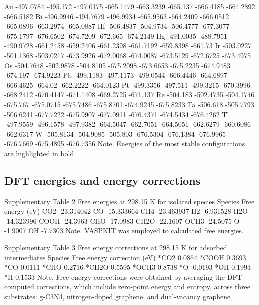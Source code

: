 Au	-497.0784	-495.172	-497.0175	-665.1479	-663.3239	-665.137	-666.4185	-664.2892	-666.5182
Bi	-496.9946	-494.7679	-496.9934	-665.9563	-664.2409	-666.0512	-665.0896	-663.2974	-665.0887
Hf	-506.4837	-504.9734	-506.4777	-677.3077	-675.1797	-676.6502	-674.7209	-672.665	-674.2149
Hg	-491.0035	-488.7951	-490.9728	-661.2458	-659.2406	-661.2398	-661.7192	-659.8398	-661.73
Ir	-503.0227	-501.1368	-503.0217	-673.9926	-672.0068	-674.0087	-673.5129	-672.6725	-673.4975
Os	-504.7648	-502.9878	-504.8105	-675.2098	-673.6653	-675.2235	-674.9483	-674.197	-674.9223
Pb	-499.1183	-497.1173	-499.0544	-666.4446	-664.6897	-666.4625	-664.02	-662.2222	-664.0123
Pt	-499.3356	-497.511	-499.3215	-670.3996	-668.2412	-670.4147	-671.1408	-669.2725	-671.137
Re	-504.183	-502.4735	-504.1746	-675.767	-675.0715	-675.7486	-675.8701	-674.9245	-675.8233
Ta	-506.618	-505.7793	-506.6241	-677.7222	-675.9907	-677.0911	-676.4371	-674.5434	-676.4262
Tl	-497.9559	-496.1578	-497.9382	-664.5047	-662.7051	-664.5051	-662.6279	-660.6086	-662.6317
W	-505.8134	-504.9085	-505.803	-676.5304	-676.1384	-676.9965	-676.7669	-675.4895	-676.7356
Note. Energies of the most stable configurations are highlighted in bold.


\subsection{DFT energies and energy corrections}


Supplementary Table 2
Free energies at 298.15 K for isolated species
Species	Free energy (eV)
CO2	-23.314042
CO	-15.333664
CH4	-23.463937
H2	-6.931528
H2O	-14.323996
COOH	-24.3963
CHO	-17.0983
CH2O	-22.1607
OCH3	-24.5075
O	-1.9007
OH	-7.7303
Note. VASPKIT \cite{wang2021vaspkit} was employed to calculated free energies.


Supplementary Table 3
Free energy corrections at 298.15 K for adsorbed intermediates
Species	Free energy correction (eV)
*CO2	0.0864
*COOH	0.3693
*CO	0.0111
*CHO	0.2716
*CH2O	0.5595
*OCH3	0.8738
*O	-0.0193
*OH	0.1993
*H	0.1533
Note. Free energy corrections were obtained by averaging the DFT-computed corrections, which include zero-point energy and entropy, across three substrates: g-C3N4, nitrogen-doped graphene, and dual-vacancy graphene


